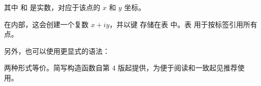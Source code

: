 \begin{mybox}
\end{mybox}

其中  和  是实数，对应于该点的 $x$ 和 $y$ 坐标。

\medskip

在内部，这会创建一个复数 $x + i y$，并以键  存储在表  中。表  用于按标签引用所有点。

\medskip

另外，也可以使用更显式的语法：

\begin{center}
\end{center}


两种形式等价。简写构造函数自第 4 版起提供，为便于阅读和一致起见推荐使用。



